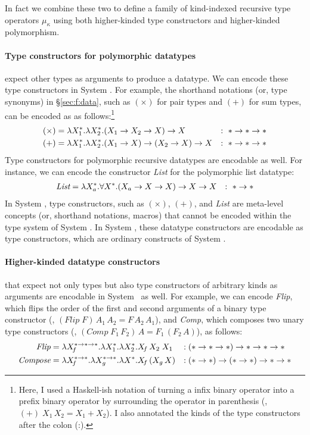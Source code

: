 In fact we combine these two to define 
a family of kind-indexed recursive type operators $\mu_\kappa$ using both
higher-kinded type constructors and higher-kinded polymorphism.



\paragraph{Type constructors for polymorphic datatypes} expect
other types as arguments to produce a datatype. We can encode these 
type constructors in System \Fw. For example, the shorthand notations
(or, type synonyms) in \S\ref{sec:f:data}, such as $(\times)$ for pair types
and $(+)$ for sum types, can be encoded as as follows:\footnote{Here,
        I used a Haskell-ish notation of turning a infix binary operator
        into a prefix binary operator by surrounding the operator in parenthesis
        (\eg, $(+)\;X_1\,X_2 = X_1 + X_2$). I also annotated the kinds of
        the type constructors after the colon (:).}
\begin{align*}
(\times) &= \lambda X_1^{*}.\lambda X_2^{*}.(X_1 -> X_2 -> X) -> X &:~ * -> * -> * \\
     (+) &= \lambda X_1^{*}.\lambda X_2^{*}.(X_1 -> X) -> (X_2 -> X) -> X &:~ * -> * -> *
\end{align*}
Type constructors for polymorphic recursive datatypes are encodable as well.
For instance, we can encode the constructor \textit{List}
for the polymorphic list datatype:
\begin{align*}
        \textit{List} &= \lambda X_a^{*}.\forall X^{*}.(X_a -> X -> X) -> X -> X
        &:~ * -> *
\end{align*}
In System \F, type constructors, such as $(\times)$, $(+)$, and
\textit{List} are meta-level concepts (or, shorthand notations, macros)
that cannot be encoded within the type system of System \F.
In System \Fw, these datatype constructors are encodable as type constructors,
which are ordinary constructs of System \Fw.

\paragraph{Higher-kinded datatype constructors} that expect
not only types but also type constructors of arbitrary kinds as arguments
are encodable in System \Fw\ as well. For example, we can encode
\textit{Flip}, which flips the order of the first and second arguments of
a binary type constructor (\ie, $(\textit{Flip}\;F)\,A_1\,A_2 = F\,A_2\,A_1$),
and \textit{Comp}, which composes two unary type constructors
(\ie, $(\textit{Comp}\;F_1\,F_2)\,A = F_1\,(F_2\,A)$), as follows:
\begin{align*}
\textit{Flip} &= \lambda X_{\!f}^{*-> *-> *}.\lambda X_1^{*}.\lambda X_2^{*}.X_{\!f}\,X_2\;X_1
                     &:\;& (* -> * -> *) -> * -> * -> * \\
\textit{Compose} &= \lambda X_{\!f}^{*-> *}.\lambda X_g^{*-> *}.\lambda X^{*}.X_{\!f}\,(X_g\,X)
                     &:\;& (* -> *) -> (* -> *) -> * -> *
\end{align*}

